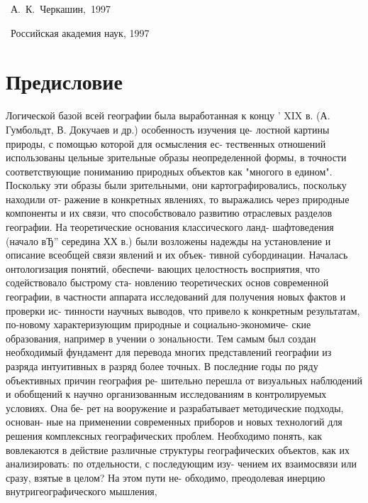 \documentclass[12pt,draft,openany]{extbook}
\begin{document}
\vfill{}
\begin{minipage}[t]{20em}
\mbox{}\par
\ISBN{}
\end{minipage}\hfill
\begin{minipage}[t]{0.7\linewidth{}}
\noindent\sucopyright~А.~К.~Черкашин,~1997\par
\noindent\sucopyright~Российская академия наук, 1997
\end{minipage}
\endgroup
\newpage
\tableofcontents{}
\chapter*{Предисловие}
Логической базой всей географии была выработанная к концу
' XIX в. (А. Гумбольдт, В. Докучаев и др.) особенность изучения це-
лостной картины природы, с помощью которой для осмысления ес-
тественных отношений использованы цельные зрительные образы
неопределенной формы, в точности соответствующие пониманию
природных объектов как "многого в едином". Поскольку эти образы
были зрительными, они картографировались, поскольку находили от-
ражение в конкретных явлениях, то выражались через природные
компоненты и их связи, что способствовало развитию отраслевых
разделов географии. На теоретические основания классического ланд-
шафтоведения (начало вЂ” середина ХХ в.) были возложены надежды
на установление и описание всеобщей связи явлений и их объек-
тивной субординации. Началась онтологизация понятий, обеспечи-
вающих целостность восприятия, что содействовало быстрому ста-
новлению теоретических основ современной географии, в частности
аппарата исследований для получения новых фактов и проверки ис-
тинности научных выводов, что привело к конкретным результатам,
по-новому характеризующим природные и социально-экономиче-
ские образования, например в учении о зональности. Тем самым был
создан необходимый фундамент для перевода многих представлений
географии из разряда интуитивных в разряд более точных.
В последние годы по ряду объективных причин география ре-
шительно перешла от визуальных наблюдений и обобщений к научно
организованным исследованиям в контролируемых условиях. Она бе-
рет на вооружение и разрабатывает методические подходы, основан-
ные на применении современных приборов и новых технологий для
решения комплексных географических проблем. Необходимо понять,
как вовлекаются в действие различные структуры географических
объектов, как их анализировать: по отдельности, с последующим изу-
чением их взаимосвязи или сразу, взятые в целом? На этом пути не-
обходимо, преодолевая инерцию внутригеографического мышления,
\end{document}
